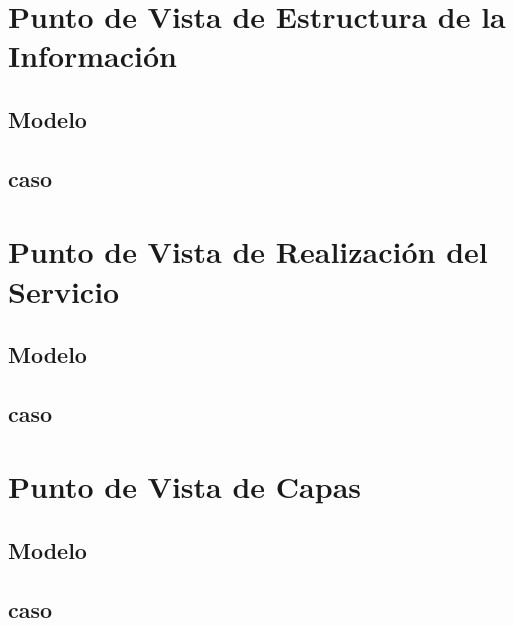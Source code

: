 \newpage

\section{Punto de Vista de Estructura de la Información}

\subsection{Modelo}

\newpage

\subsection{caso}

\newpage

\section{Punto de Vista de Realización del Servicio}

\subsection{Modelo}

\newpage

\subsection{caso}

\newpage

\section{Punto de Vista de Capas}

\subsection{Modelo}

\newpage

\subsection{caso}

\newpage

